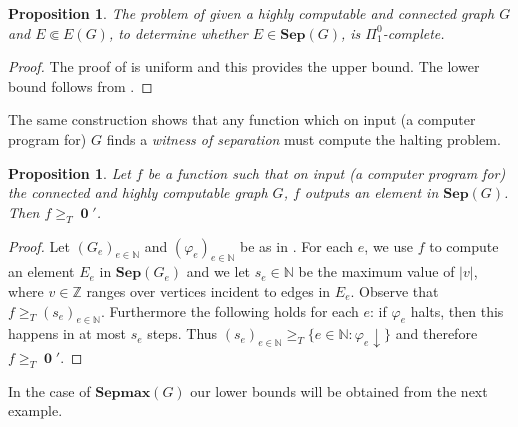 \documentclass[10pt,A4]{amsart}
\newtheorem{prop}[thm]{Proposition}
\theoremstyle{definition}
\theoremstyle{definition}
\newcommand{\N}{\mathbb{N}}
\newcommand{\Z}{\mathbb{Z}}
\newcommand{\sep}[1]{\mathbf{Sep}({#1})}
\newcommand{\Sep}[1]{\mathbf{Sep}({#1})}
\newcommand{\sepmax}[1]{\mathbf{Sepmax}({#1})}
\newcommand{\HP}{\operatorname{\mathbf{0}} '}
\begin{document}
\begin{prop}\label{complexity-of-sep-uniform-version}
The problem of given a highly computable and connected graph $G$ and $E\Subset E(G)$, to determine whether $E\in \Sep{G}$, is $\Pi_1^0$-complete.
\end{prop}
\begin{proof}
    The proof of  is uniform and this provides the upper bound. The lower bound follows from . 
\end{proof}
The same construction shows that any function which on input (a computer program for) $G$ finds a \textit{witness of separation} must compute the halting problem. 
\begin{prop}\label{computing-one-element-in-sep-is-Turing-complete}
Let $f$ be a function such that on input (a computer program for) the connected and highly computable graph $G$, $f$ outputs an element in $\sep{G}$. Then $f\geq_T\HP$.
\end{prop}
\begin{proof}
    Let $(G_e)_{e\in\N}$ and  $(\varphi_e)_{e\in\N}$ be as in . For each $e$, we use $f$ to compute an element $E_e$ in $\sep{G_e}$ and we let $s_e\in\N$ be the maximum value of $|v|$, where $v\in \Z$ ranges over vertices incident to edges in $E_e$. Observe that $f\geq_T (s_e)_{e\in\N}$. Furthermore the following holds for each $e$: if $\varphi_e$ halts, then this happens in at most $s_e$ steps.  Thus $(s_e)_{e\in\N}\geq_T\{e\in\N : \varphi_e\downarrow\}$ and therefore $f\geq_T\HP$.
\end{proof}
In the case of $\sepmax{G}$ our lower bounds will be obtained from the next example. 
\end{document}
